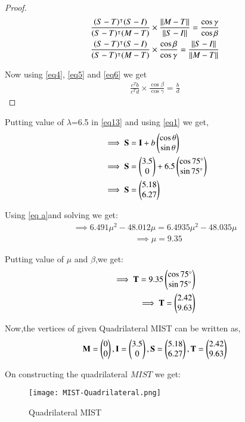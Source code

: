 \documentclass[journal,12pt,twocolumn]{IEEEtran}
\begin{document}
\begin{enumerate}
\begin{proof}
\begin{align}
\frac{(S-T)^\intercal(S-I)}{(S-T)^\intercal(M-T)} \times \frac{\Vert M-T\rVert}{\Vert S-I\rVert}=\frac{\cos \gamma}{\cos \beta} 
\\
\frac{(S-T)^\intercal(S-I)}{(S-T)^\intercal(M-T)} \times \frac{\cos \beta}{\cos \gamma}= \frac{\Vert S-I\rVert}{\Vert M-T\rVert}
\end{align}
\item Now using \eqref{eq4}, \eqref{eq5} and \eqref{eq6} we get
\begin{align}
\frac{c^Tb}{c^T d} \times \frac{\cos \beta}{\cos \gamma} =\frac{b}{d} \label{eq a}
\end{align}
\end{proof}
\item Putting value of $\lambda$=6.5 in \eqref{eq13} and using \eqref{eq1} we get,
\begin{align}
&\implies \mathbf{S}=\mathbf{I} +b\begin{pmatrix}\cos\theta \\\sin \theta \end{pmatrix}
\\
&\implies \mathbf{S}=\begin{pmatrix}3.5\\0\end{pmatrix} +6.5\begin{pmatrix}\cos 75 \degree\\\sin 75 \degree\end{pmatrix} 
\\
&\implies \mathbf{S}=\begin{pmatrix}5.18\\6.27\end{pmatrix}
\end{align}

\item Using \eqref{eq a}and solving we get:
\begin{align}
\implies 6.491 \mu^2 -48.012\mu =6.4935\mu^2-48.035\mu
\end{align}
\begin{align}
&\implies \mu=9.35
\end{align}
\item Putting value of $\mu$  and $\beta$,we get:
\begin{align}
\implies \mathbf{T} =9.35\begin{pmatrix}\cos 75 \degree\\\sin 75 \degree\end{pmatrix} 
\\
\implies \mathbf{T}=\begin{pmatrix}2.42\\9.63\end{pmatrix} 
\end{align}
   \item Now,the vertices of given Quadrilateral MIST can be written as,
\begin{align}
 \mathbf{M}=\begin{pmatrix}0\\0\end{pmatrix},\mathbf{I} = \begin{pmatrix}3.5\\0\end{pmatrix}, \mathbf{S}=\begin{pmatrix}5.18\\6.27\end{pmatrix},\mathbf{T}=\begin{pmatrix}2.42\\9.63\end{pmatrix}
\end{align}
    \item On constructing the quadrilateral $MIST$ we get:
\end{enumerate}


\begin{figure}[!ht]
\centering
\texttt{[image: MIST-Quadrilateral.png]}
\caption{Quadrilateral MIST}
\label{fig:Quadrilateral MIST}	
\end{figure}
\end{document}
